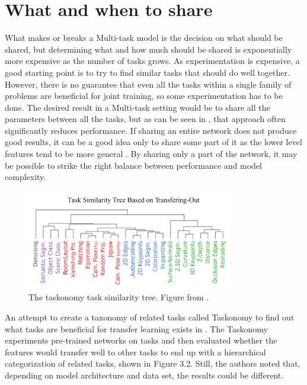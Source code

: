 \section{What and when to share}
What makes or breaks a Multi-task model is the decision on what should be shared, but determining what and how much should be shared is exponentially more expensive as the number of tasks grows.
As experimentation is expensive, a good starting point is to try to find similar tasks that should do well together.
However, there is no guarantee that even all the tasks within a single family of problems are beneficial for joint training, so some experimentation has to be done.
The desired result in a Multi-task setting would be to share all the parameters between all the tasks, but as can be seen in \citep{uberNet}, that approach often significantly reduces performance.
If sharing an entire network does not produce good results, it can be a good idea only to share some part of it as the lower level features tend to be more general \citep{transferringMidLevelRepresentations}.
By sharing only a part of the network, it may be possible to strike the right balance between performance and model complexity.

\begin{figure}[h!]
    \centering
    \includegraphics[width=0.8\textwidth]{imgs/taskonomy.png}
    \caption{The taskonomy task similarity tree. Figure from \citep{taskonomy}.\label{fig:params}}
\end{figure}

An attempt to create a taxonomy of related tasks called Taskonomy to find out what tasks are beneficial for transfer learning exists in \citep{taskonomy}.
The Taskonomy experiments pre-trained networks on tasks and then evaluated whether the features would transfer well to other tasks to end up with a hierarchical categorization of related tasks, shown in Figure 3.2.
Still, the authors noted that, depending on model architecture and data set, the results could be different.

